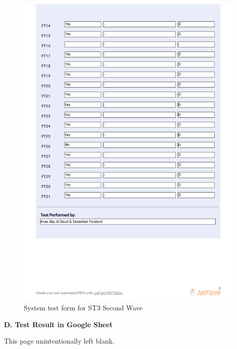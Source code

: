 \documentclass{article}
\begin{document}
 \begin{figure}
     \centering
     \includegraphics[width=13cm]{images/2021-03-08_Anas_ST3-2}
     \renewcommand\figurename{Figure}
     \caption{System test form for ST3 Second Wave}
     \label{fig:my_label}
 \end{figure}

\newpage
\begin{flushleft}
{\large \textbf{D. Test Result in Google Sheet}}
\end{flushleft}

\vspace*{\fill}
                \hfill
                \begin{center}
                This page unintentionally left blank.
                \end{center}
                \vspace{\fill}
                \thispagestyle{empty}
\end{document}
